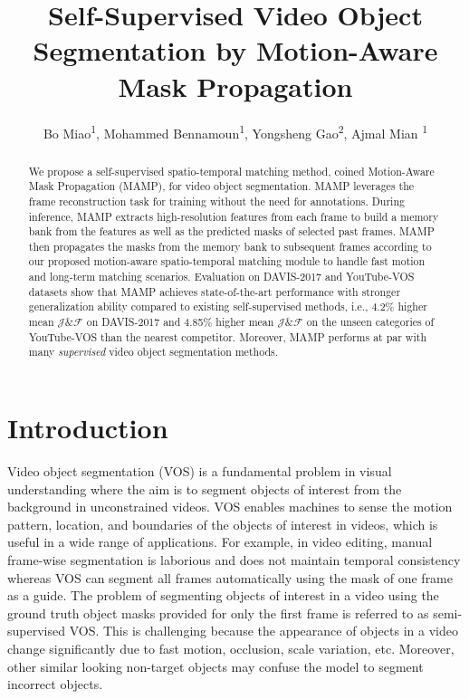 \documentclass[letterpaper]{article} \usepackage{aaai22}  \usepackage{times}  \usepackage{helvet}  \usepackage{courier}  \usepackage[hyphens]{url}  \usepackage{graphicx} \urlstyle{rm} \def\UrlFont{\rm}  \usepackage{natbib}  \usepackage{caption} \DeclareCaptionStyle{ruled}{labelfont=normalfont,labelsep=colon,strut=off} \frenchspacing  \setlength{\pdfpagewidth}{8.5in}  \setlength{\pdfpageheight}{11in}  \usepackage{algorithm}
\title{Self-Supervised Video Object Segmentation by Motion-Aware Mask Propagation}
\author {
Bo Miao\textsuperscript{\rm 1},
    Mohammed Bennamoun\textsuperscript{\rm 1},
    Yongsheng Gao\textsuperscript{\rm 2},
    Ajmal Mian \textsuperscript{\rm 1}
}
\begin{document}
\maketitle


\begin{abstract}

We propose a self-supervised spatio-temporal matching method, coined Motion-Aware Mask Propagation (MAMP), for video object segmentation. MAMP leverages the frame reconstruction task for training without the need for annotations. During inference, MAMP extracts high-resolution features from each frame to build a memory bank from the features as well as the predicted masks of selected past frames. MAMP then propagates the masks from the memory bank to subsequent frames according to our proposed motion-aware spatio-temporal matching module to handle fast motion and long-term matching scenarios. Evaluation on DAVIS-2017 and YouTube-VOS datasets show that MAMP achieves state-of-the-art performance with stronger generalization ability compared to existing self-supervised methods, i.e., 4.2\% higher mean $\mathcal{J}\&\mathcal{F}$ on DAVIS-2017 and 4.85\% higher mean $\mathcal{J}\&\mathcal{F}$ on the unseen categories of YouTube-VOS than the nearest competitor. Moreover, MAMP performs at par with many {\em supervised} video object segmentation methods.
\end{abstract}

\section{Introduction}

Video object segmentation (VOS) is a fundamental problem in visual understanding where the aim is to segment objects of interest from the background in unconstrained videos. VOS enables machines to sense the motion pattern, location, and boundaries of the objects of interest in videos, which is useful in a wide range of applications. For example, in video editing, manual frame-wise segmentation is laborious and does not maintain temporal consistency whereas VOS can segment all frames automatically using the mask of one frame as a guide. The problem of segmenting objects of interest in a video using the ground truth object masks provided for only the first frame is referred to as semi-supervised VOS. This is challenging because the appearance of objects in a video change significantly due to fast motion, occlusion, scale variation, etc. Moreover, other similar looking non-target objects may confuse the model to segment incorrect objects.
\end{document}
